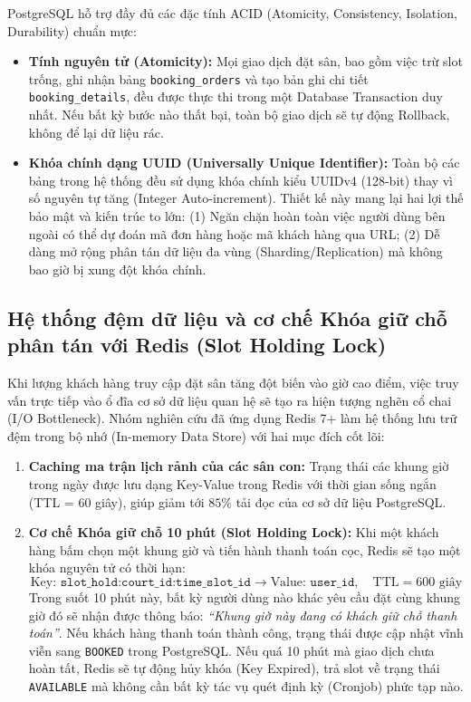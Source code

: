 PostgreSQL hỗ trợ đầy đủ các đặc tính ACID (Atomicity, Consistency, Isolation, Durability) chuẩn mực:
\begin{itemize}[leftmargin=1.5cm]
    \item \textbf{Tính nguyên tử (Atomicity):} Mọi giao dịch đặt sân, bao gồm việc trừ slot trống, ghi nhận bảng \texttt{booking\_orders} và tạo bản ghi chi tiết \texttt{booking\_details}, đều được thực thi trong một Database Transaction duy nhất. Nếu bất kỳ bước nào thất bại, toàn bộ giao dịch sẽ tự động Rollback, không để lại dữ liệu rác.
    \item \textbf{Khóa chính dạng UUID (Universally Unique Identifier):} Toàn bộ các bảng trong hệ thống đều sử dụng khóa chính kiểu UUIDv4 (128-bit) thay vì số nguyên tự tăng (Integer Auto-increment). Thiết kế này mang lại hai lợi thế bảo mật và kiến trúc to lớn: (1) Ngăn chặn hoàn toàn việc người dùng bên ngoài có thể dự đoán mã đơn hàng hoặc mã khách hàng qua URL; (2) Dễ dàng mở rộng phân tán dữ liệu đa vùng (Sharding/Replication) mà không bao giờ bị xung đột khóa chính.
\end{itemize}

\subsection{Hệ thống đệm dữ liệu và cơ chế Khóa giữ chỗ phân tán với Redis (Slot Holding Lock)}
Khi lượng khách hàng truy cập đặt sân tăng đột biến vào giờ cao điểm, việc truy vấn trực tiếp vào ổ đĩa cơ sở dữ liệu quan hệ sẽ tạo ra hiện tượng nghẽn cổ chai (I/O Bottleneck). Nhóm nghiên cứu đã ứng dụng Redis 7+ làm hệ thống lưu trữ đệm trong bộ nhớ (In-memory Data Store) với hai mục đích cốt lõi:
\begin{enumerate}[label=\arabic*)]
    \item \textbf{Caching ma trận lịch rảnh của các sân con:} Trạng thái các khung giờ trong ngày được lưu dạng Key-Value trong Redis với thời gian sống ngắn (TTL = 60 giây), giúp giảm tới $85\%$ tải đọc của cơ sở dữ liệu PostgreSQL.
    \item \textbf{Cơ chế Khóa giữ chỗ 10 phút (Slot Holding Lock):} Khi một khách hàng bấm chọn một khung giờ và tiến hành thanh toán cọc, Redis sẽ tạo một khóa nguyên tử có thời hạn:
    \begin{equation}
        \text{Key: } \texttt{slot\_hold:court\_id:time\_slot\_id} \rightarrow \text{Value: } \texttt{user\_id}, \quad \text{TTL} = 600\text{ giây}
    \end{equation}
    Trong suốt 10 phút này, bất kỳ người dùng nào khác yêu cầu đặt cùng khung giờ đó sẽ nhận được thông báo: \textit{``Khung giờ này đang có khách giữ chỗ thanh toán''}. Nếu khách hàng thanh toán thành công, trạng thái được cập nhật vĩnh viễn sang \texttt{BOOKED} trong PostgreSQL. Nếu quá 10 phút mà giao dịch chưa hoàn tất, Redis sẽ tự động hủy khóa (Key Expired), trả slot về trạng thái \texttt{AVAILABLE} mà không cần bất kỳ tác vụ quét định kỳ (Cronjob) phức tạp nào.
\end{enumerate}

